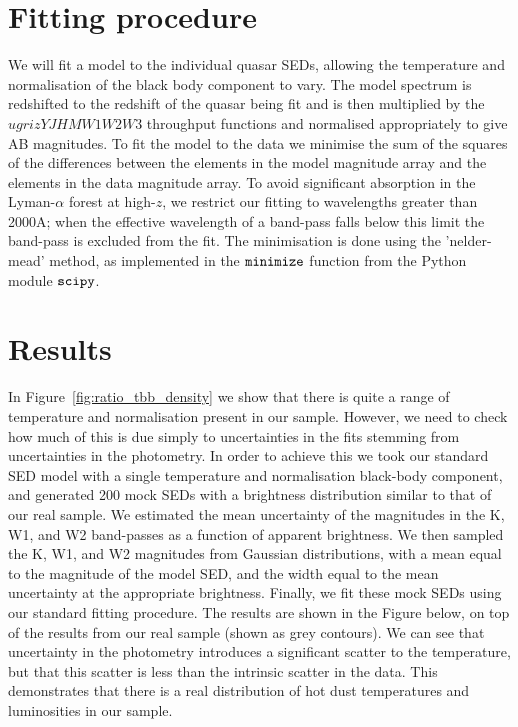 \section{Fitting procedure}

We will fit a model to the individual quasar SEDs, allowing the temperature and normalisation of the black body component to vary. 
The model spectrum is redshifted to the redshift of the quasar being fit and is then multiplied by the $ugrizYJHMW1W2W3$ throughput functions and normalised appropriately to give AB magnitudes. 
To fit the model to the data we minimise the sum of the squares of the differences between the elements in the model magnitude array and the elements in the data magnitude array. 
To avoid significant absorption in the Lyman-$\alpha$ forest at high-$z$, we restrict our fitting to wavelengths greater than 2000A; when the effective wavelength of a band-pass falls below this limit the band-pass is excluded from the fit. 
The minimisation is done using the 'nelder-mead' method, as implemented in the ${\tt minimize}$ function from the Python module ${\tt scipy}$. 

\section{Results}


In Figure~\ref{fig:ratio_tbb_density} we show that there is quite a range of temperature and normalisation present in our sample. 
However, we need to check how much of this is due simply to uncertainties in the fits stemming from uncertainties in the photometry. 
In order to achieve this we took our standard SED model with a single temperature and normalisation black-body component, and generated 200 mock SEDs with a brightness distribution similar to that of our real sample. 
We estimated the mean uncertainty of the magnitudes in the K, W1, and W2 band-passes as a function of apparent brightness. 
We then sampled the K, W1, and W2 magnitudes from Gaussian distributions, with a mean equal to the magnitude of the model SED, and the width equal to the mean uncertainty at the appropriate brightness. 
Finally, we fit these mock SEDs using our standard fitting procedure. 
The results are shown in the Figure below, on top of the results from our real sample (shown as grey contours). 
We can see that uncertainty in the photometry introduces a significant scatter to the temperature, but that this scatter is less than the intrinsic scatter in the data. 
This demonstrates that there is a real distribution of hot dust temperatures and luminosities in our sample. 

